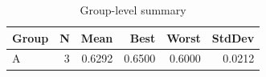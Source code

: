 \begin{table}[htbp]
\centering
\caption{Group-level summary}
\label{tab:group-summary}
\begin{tabular}{lrrrrr}
\toprule
\textbf{Group} & \textbf{N} & \textbf{Mean} & \textbf{Best} & \textbf{Worst} & \textbf{StdDev} \\
\midrule
A & 3 & 0.6292 & 0.6500 & 0.6000 & 0.0212 \\
\bottomrule
\end{tabular}
\end{table}